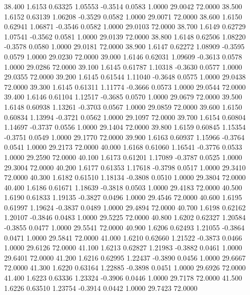   38.400   1.6153   0.63325   1.05553  -0.3514   0.0583   1.0000  29.0042  72.0000
  38.500   1.6152   0.63139   1.06208  -0.3529   0.0582   1.0000  29.0071  72.0000
  38.600   1.6150   0.62941   1.06871  -0.3546   0.0582   1.0000  29.0103  72.0000
  38.700   1.6149   0.62729   1.07541  -0.3562   0.0581   1.0000  29.0139  72.0000
  38.800   1.6148   0.62506   1.08220  -0.3578   0.0580   1.0000  29.0181  72.0000
  38.900   1.6147   0.62272   1.08909  -0.3595   0.0579   1.0000  29.0230  72.0000
  39.000   1.6146   0.62031   1.09609  -0.3613   0.0578   1.0000  29.0286  72.0000
  39.100   1.6145   0.61787   1.10318  -0.3630   0.0577   1.0000  29.0355  72.0000
  39.200   1.6145   0.61544   1.11040  -0.3648   0.0575   1.0000  29.0438  72.0000
  39.300   1.6145   0.61311   1.11774  -0.3666   0.0573   1.0000  29.0544  72.0000
  39.400   1.6146   0.61104   1.12517  -0.3685   0.0570   1.0000  29.0679  72.0000
  39.500   1.6148   0.60938   1.13261  -0.3703   0.0567   1.0000  29.0859  72.0000
  39.600   1.6150   0.60834   1.13994  -0.3721   0.0562   1.0000  29.1097  72.0000
  39.700   1.6154   0.60804   1.14697  -0.3737   0.0556   1.0000  29.1404  72.0000
  39.800   1.6159   0.60845   1.15354  -0.3751   0.0549   1.0000  29.1770  72.0000
  39.900   1.6163   0.60937   1.15966  -0.3764   0.0541   1.0000  29.2173  72.0000
  40.000   1.6168   0.61060   1.16541  -0.3776   0.0533   1.0000  29.2590  72.0000
  40.100   1.6173   0.61201   1.17089  -0.3787   0.0525   1.0000  29.3004  72.0000
  40.200   1.6177   0.61353   1.17618  -0.3798   0.0517   1.0000  29.3410  72.0000
  40.300   1.6182   0.61510   1.18134  -0.3808   0.0510   1.0000  29.3804  72.0000
  40.400   1.6186   0.61671   1.18639  -0.3818   0.0503   1.0000  29.4183  72.0000
  40.500   1.6190   0.61833   1.19135  -0.3827   0.0496   1.0000  29.4546  72.0000
  40.600   1.6195   0.61997   1.19624  -0.3837   0.0489   1.0000  29.4894  72.0000
  40.700   1.6198   0.62162   1.20107  -0.3846   0.0483   1.0000  29.5225  72.0000
  40.800   1.6202   0.62327   1.20584  -0.3855   0.0477   1.0000  29.5541  72.0000
  40.900   1.6206   0.62493   1.21055  -0.3864   0.0471   1.0000  29.5841  72.0000
  41.000   1.6210   0.62660   1.21522  -0.3873   0.0466   1.0000  29.6126  72.0000
  41.100   1.6213   0.62827   1.21983  -0.3882   0.0461   1.0000  29.6401  72.0000
  41.200   1.6216   0.62995   1.22437  -0.3890   0.0456   1.0000  29.6667  72.0000
  41.300   1.6220   0.63164   1.22885  -0.3898   0.0451   1.0000  29.6926  72.0000
  41.400   1.6223   0.63336   1.23324  -0.3906   0.0446   1.0000  29.7178  72.0000
  41.500   1.6226   0.63510   1.23754  -0.3914   0.0442   1.0000  29.7423  72.0000
